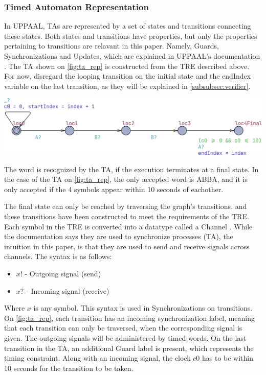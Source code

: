 \subsubsection{Timed Automaton Representation}\label{subsubsec:ta_rep}
In UPPAAL, TAs are represented by a set of states and transitions connecting these states.
Both states and transitions have properties, but only the properties pertaining to transitions are relavant in this paper. Namely, Guards, Synchronizations and Updates, which are explained in UPPAAL's documentation \cite{UPPAAL}.
The TA shown on \cref{fig:ta_rep} is constructed from the TRE described above. For now, disregard the looping transition on the initial state and the endIndex variable on the last transition, as they will be explained in \cref{subsubsec:verifier}.
\begin{center}
    \includegraphics[width=\columnwidth]{Documents/Diagrams/CheckingFigures/checking_tarep.png}
    \label{fig:ta_rep}
\end{center}
The word is recognized by the TA, if the execution terminates at a final state.
In the case of the TA on \cref{fig:ta_rep}, the only accepted word is ABBA, and it is only accepted if the 4 symbols appear within 10 seconds of eachother.

The final state can only be reached by traversing the graph's transitions, and these transitions have been constructed to meet the requirements of the TRE. Each symbol in the TRE is converted into a datatype called a Channel \cite{UPPAAL}. While the documentation says they are used to synchronize processes (TA), the intuition in this paper, is that they are used to send and receive signals across channels. The syntax is as follows:
\begin{itemize}
    \setlength\itemsep{-0.5em}
    \item $x!$ - Outgoing signal (send)
    \item $x?$ - Incoming signal (receive)
\end{itemize}
Where $x$ is any symbol. This syntax is used in Synchronizations on transitions. On \cref{fig:ta_rep}, each transition has an incoming synchronization label, meaning that each transition can only be traversed, when the corresponding signal is given. The outgoing signals will be administered by timed words. On the last transition in the TA, an additional Guard label is present, which represents the timing constraint. Along with an incoming signal, the clock $c0$ has to be within 10 seconds for the transition to be taken.

